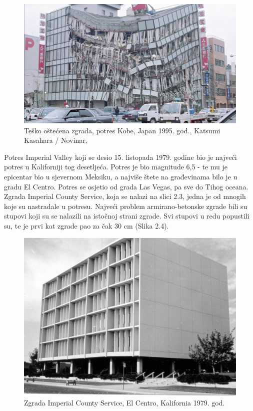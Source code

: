 \documentclass[12pt]{book}
\begin{document}
\begin{figure}[h]
	\centering
	\includegraphics[width=0.8\linewidth]{Slike/screenshot004}
	\caption{Teško oštećena zgrada, potres Kobe, Japan 1995. god., Katsumi Kasahara / Novinar, \cite{kobe_slika}}
	\label{fig:screenshot004_novo}
\end{figure}

\newpage

Potres Imperial Valley koji se desio 15. listopada 1979. godine bio je najveći potres u Kaliforniji tog desetljeća. Potres je bio magnitude 6,5 - te mu je epicentar bio u sjevernom Meksiku, a najviše štete na građevinama bilo je u gradu El Centro. Potres se osjetio od grada Las Vegas, pa sve do Tihog oceana. Zgrada Imperial County Service, koja se nalazi na slici 2.3,  jedna je od mnogih koje su nastradale u potresu. Najveći problem armirano-betonske zgrade bili su stupovi koji su se nalazili na istočnoj strani zgrade. Svi stupovi u redu popustili su, te je prvi kat zgrade pao za čak 30 cm (Slika 2.4). \cite{valley_report}

\begin{figure}[h]
	\centering
	\includegraphics[width=0.8\linewidth]{Slike/imperial_valley}
	\caption{Zgrada Imperial County Service, El Centro, Kalifornia 1979. god. \cite{valley_report}}
	\label{fig:imperialvalley}
\end{figure}
\end{document}

